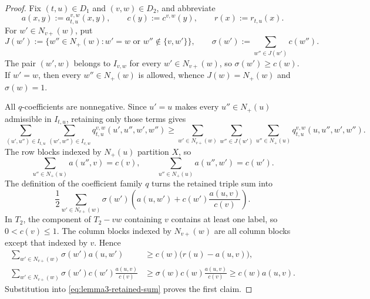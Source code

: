 \documentclass[12pt]{article}
\begin{document}
\begin{proof}
Fix $(t,u)\in D_1$ and $(v,w)\in D_2$, and abbreviate
\begin{equation}\label{eq:display-060}
a(x,y):=a_{t,u}^{v,w}(x,y),\qquad
c(y):=c^{v,w}(y),\qquad r(x):=r_{t,u}(x).
\end{equation}
For $w'\in N_{v+}(w)$, put
\begin{equation}\label{eq:display-061}
J(w'):=\{w''\in N_+(w):w'=w\text{ or }w''\notin\{v,w'\}\},
\qquad
\sigma(w'):=\sum_{w''\in J(w')}c(w'').
\end{equation}
The pair $(w',w)$ belongs to $I_{v,w}$ for every
$w'\in N_{v+}(w)$, so $\sigma(w')\ge c(w)$.  If $w'=w$, then every
$w''\in N_+(w)$ is allowed, whence $J(w)=N_+(w)$ and $\sigma(w)=1$.

All $q$-coefficients are nonnegative.  Since $u'=u$ makes every
$u''\in N_+(u)$ admissible in $I_{t,u}$, retaining only those terms gives
\begingroup\footnotesize
\begin{equation}\label{eq:display-062}
\sum_{(u',u'')\in I_{t,u}}
\sum_{(w',w'')\in I_{v,w}}q_{t,u}^{v,w}(u',u'',w',w'')
\ge
\sum_{w'\in N_{v+}(w)}\sum_{w''\in J(w')}
\sum_{u''\in N_+(u)}q_{t,u}^{v,w}(u,u'',w',w'').
\end{equation}
\endgroup
The row blocks indexed by $N_+(u)$ partition $X$, so
\begin{equation}\label{eq:display-063}
\sum_{u''\in N_+(u)}a(u'',v)=c(v),
\qquad
\sum_{u''\in N_+(u)}a(u'',w')=c(w').
\end{equation}
The definition of the coefficient family $q$ turns the retained triple sum into
\begingroup\small
\begin{equation}
\frac12\sum_{w'\in N_{v+}(w)}\sigma(w')
\left(a(u,w')+c(w')\frac{a(u,v)}{c(v)}\right).
\label{eq:lemma3-retained-sum}
\end{equation}
\endgroup
In $T_2$, the component of $T_2-vw$ containing $v$ contains at least one
label, so $0<c(v)\le1$.  The column blocks indexed
by $N_{v+}(w)$ are all column blocks except that indexed by $v$.  Hence
\begin{equation}\label{eq:display-064}
\begin{aligned}
\sum_{w'\in N_{v+}(w)}\sigma(w')a(u,w')
&\ge c(w)\bigl(r(u)-a(u,v)\bigr),\\
\sum_{w'\in N_{v+}(w)}\sigma(w')c(w')\frac{a(u,v)}{c(v)}
&\ge \sigma(w)c(w)\frac{a(u,v)}{c(v)}
\ge c(w)a(u,v).
\end{aligned}
\end{equation}
Substitution into \eqref{eq:lemma3-retained-sum} proves the first claim.


\end{proof}
\end{document}
